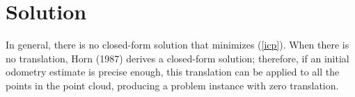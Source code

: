 \documentclass[12pt]{article}
\theoremstyle{defstyle}
\begin{document}

\section{Solution}

In general, there is no closed-form solution that minimizes (\ref*{icp}).
When there is no translation, Horn (1987) derives a closed-form solution; therefore, if an initial odometry estimate is precise enough, this translation can be applied to all the points in the point cloud, producing a problem instance with zero translation.
\end{document}
